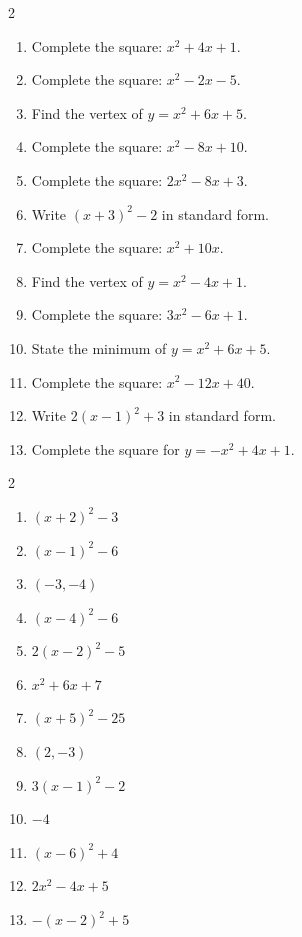 \documentclass[11pt]{article}
\begin{document}
\begin{recapbox}
\begin{multicols}{2}
\small
\begin{enumerate}[leftmargin=*,itemsep=3pt]
  \item Complete the square: $x^2+4x+1$.
  \item Complete the square: $x^2-2x-5$.
  \item Find the vertex of $y=x^2+6x+5$.
  \item Complete the square: $x^2-8x+10$.
  \item Complete the square: $2x^2-8x+3$.
  \item Write $(x+3)^2-2$ in standard form.
  \item Complete the square: $x^2+10x$.
  \item Find the vertex of $y=x^2-4x+1$.
  \item Complete the square: $3x^2-6x+1$.
  \item State the minimum of $y=x^2+6x+5$.
  \item Complete the square: $x^2-12x+40$.
  \item Write $2(x-1)^2+3$ in standard form.
  \item Complete the square for $y=-x^2+4x+1$.
\end{enumerate}
\end{multicols}
\end{recapbox}

\begin{keybox}
\begin{multicols}{2}
\small
\begin{enumerate}[leftmargin=*,itemsep=3pt]
  \item $(x+2)^2-3$
  \item $(x-1)^2-6$
  \item $(-3,-4)$
  \item $(x-4)^2-6$
  \item $2(x-2)^2-5$
  \item $x^2+6x+7$
  \item $(x+5)^2-25$
  \item $(2,-3)$
  \item $3(x-1)^2-2$
  \item $-4$
  \item $(x-6)^2+4$
  \item $2x^2-4x+5$
  \item $-(x-2)^2+5$
\end{enumerate}
\end{multicols}
\end{keybox}
\end{document}
